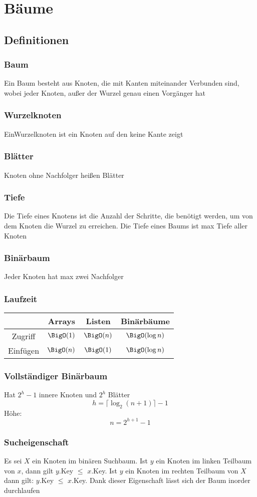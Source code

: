 \section{Bäume}
\subsection{Definitionen}
\subsubsection{Baum}
	Ein Baum besteht aus Knoten, die mit Kanten miteinander Verbunden sind, wobei jeder Knoten, außer der Wurzel genau einen Vorgänger hat
\subsubsection{Wurzelknoten}
	EinWurzelknoten ist ein Knoten auf den keine Kante zeigt
\subsubsection{Blätter}
	Knoten ohne Nachfolger heißen Blätter
\subsubsection{Tiefe}
	Die Tiefe eines Knotens ist die Anzahl der Schritte, die benötigt werden, um von dem Knoten die Wurzel zu erreichen. Die Tiefe eines Baums ist max Tiefe aller Knoten
\subsubsection{Binärbaum}
	Jeder Knoten hat max zwei Nachfolger
\subsubsection{Laufzeit}
	\begin{tabular} {c | c | c | c}
		& Arrays & Listen & Binärbäume \\
		\hline
		Zugriff & $\BigO(1)$ & $\BigO(n)$ & $\BigO(\log n)$ \\
		Einfügen & $\BigO(n)$ & $\BigO(1)$ & $\BigO(\log n)$
	\end{tabular}
\subsubsection{Vollständiger Binärbaum}
	Hat $2^h-1$ innere Knoten und $2^h$ Blätter
	$$
		h=\lceil\log_2(n+1)\rceil-1
	$$
	Höhe:
	$$
		n=2^{h+1}-1
	$$
\subsubsection{Sucheigenschaft}
	Es sei $X$ ein Knoten im binären Suchbaum. Ist $y$ ein Knoten im linken Teilbaum von $x$, dann gilt $y$.Key $\leq$ $x$.Key. Ist $y$ ein Knoten im rechten Teilbaum von $X$ dann gilt: $y$.Key $\leq$ $x$.Key. Dank dieser Eigenschaft lässt sich der Baum inorder durchlaufen
